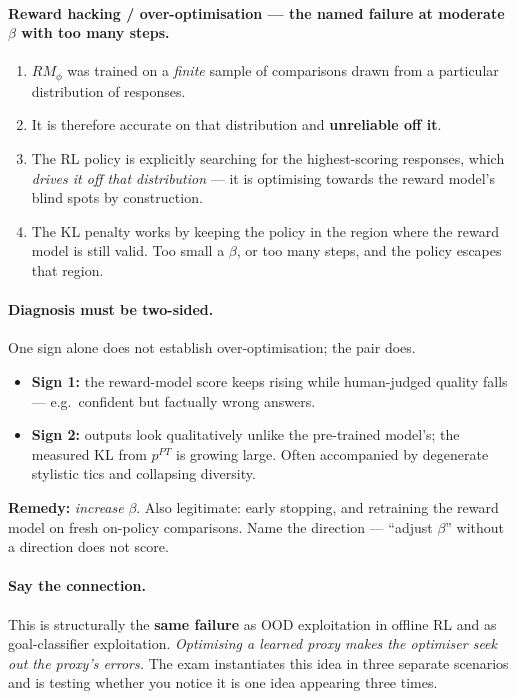 \documentclass[11pt,a4paper]{article}
\begin{document}
\paragraph{Reward hacking / over-optimisation --- the named failure at moderate
$\beta$ with too many steps.}
\begin{enumerate}[label=\arabic*.]
\item $RM_\phi$ was trained on a \emph{finite} sample of comparisons drawn
from a particular distribution of responses.
\item It is therefore accurate on that distribution and \textbf{unreliable off
it}.
\item The RL policy is explicitly searching for the highest-scoring
responses, which \emph{drives it off that distribution} --- it is optimising
towards the reward model's blind spots by construction.
\item The KL penalty works by keeping the policy in the region where the
reward model is still valid. Too small a $\beta$, or too many steps, and the
policy escapes that region.
\end{enumerate}

\paragraph{Diagnosis must be two-sided.} One sign alone does not establish
over-optimisation; the pair does.
\begin{itemize}
\item \textbf{Sign 1:} the reward-model score keeps rising while
human-judged quality falls --- e.g.\ confident but factually wrong answers.
\item \textbf{Sign 2:} outputs look qualitatively unlike the pre-trained
model's; the measured KL from $p^{PT}$ is growing large. Often accompanied
by degenerate stylistic tics and collapsing diversity.
\end{itemize}
\textbf{Remedy:} \emph{increase} $\beta$. Also legitimate: early stopping, and
retraining the reward model on fresh on-policy comparisons. Name the
direction --- ``adjust $\beta$'' without a direction does not score.

\paragraph{Say the connection.} This is structurally the \textbf{same failure}
as OOD exploitation in offline RL and as goal-classifier exploitation.
\emph{Optimising a learned proxy makes the optimiser seek out the proxy's
errors.} The exam instantiates this idea in three separate scenarios and is
testing whether you notice it is one idea appearing three times.
\end{document}
